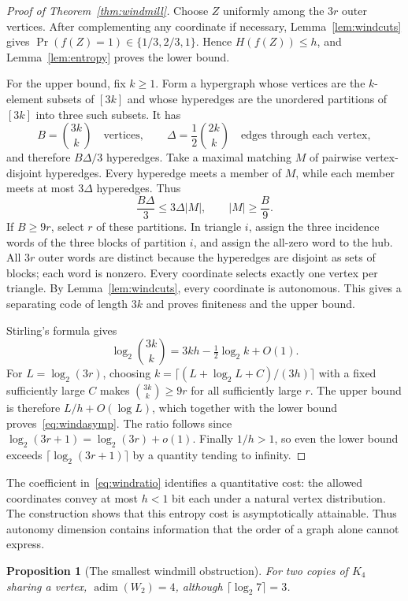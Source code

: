 \documentclass[11pt]{article}
\newtheorem{proposition}[theorem]{Proposition}
\theoremstyle{definition}
\newcommand{\adim}{\operatorname{adim}}
\numberwithin{equation}{section}
\begin{document}
\begin{proof}[Proof of Theorem~\ref{thm:windmill}]
Choose $Z$ uniformly among the $3r$ outer vertices. After complementing
any coordinate if necessary, Lemma~\ref{lem:windcuts} gives
$\Pr(f(Z)=1)\in\{1/3,2/3,1\}$. Hence $H(f(Z))\leq h$, and
Lemma~\ref{lem:entropy} proves the lower bound.

For the upper bound, fix $k\geq1$. Form a hypergraph whose vertices are
the $k$-element subsets of $[3k]$ and whose hyperedges are the unordered
partitions of $[3k]$ into three such subsets. It has
\[
 B=\binom{3k}{k}\quad\text{vertices},\qquad
 \Delta=\frac12\binom{2k}{k}\quad\text{edges through each vertex},
\]
and therefore $B\Delta/3$ hyperedges. Take a maximal matching $M$ of
pairwise vertex-disjoint hyperedges. Every hyperedge meets a member of
$M$, while each member meets at most $3\Delta$ hyperedges. Thus
\[
 \frac{B\Delta}{3}\leq3\Delta|M|,
 \qquad |M|\geq\frac B9.
\]
If $B\geq9r$, select $r$ of these partitions. In triangle $i$, assign the
three incidence words of the three blocks of partition $i$, and assign
the all-zero word to the hub. All $3r$ outer words are distinct because
the hyperedges are disjoint as sets of blocks; each word is nonzero.
Every coordinate selects exactly one vertex per triangle. By
Lemma~\ref{lem:windcuts}, every coordinate is autonomous. This gives a
separating code of length $3k$ and proves finiteness and the upper bound.

Stirling's formula gives
\[
 \log_2\binom{3k}{k}=3kh-\tfrac12\log_2 k+O(1).
\]
For $L=\log_2(3r)$, choosing
$k=\lceil(L+\log_2 L+C)/(3h)\rceil$ with a fixed sufficiently large $C$
makes $\binom{3k}{k}\geq9r$ for all sufficiently large $r$.
The upper bound is therefore $L/h+O(\log L)$, which together with the
lower bound proves~\eqref{eq:windasymp}. The ratio follows since
$\log_2(3r+1)=\log_2(3r)+o(1)$. Finally $1/h>1$, so even the lower bound
exceeds $\lceil\log_2(3r+1)\rceil$ by a quantity tending to infinity.
\end{proof}

The coefficient in~\eqref{eq:windratio} identifies a quantitative cost:
the allowed coordinates convey at most $h<1$ bit each under a natural
vertex distribution. The construction shows that this entropy cost is
asymptotically attainable. Thus autonomy dimension contains information
that the order of a graph alone cannot express.

\begin{proposition}[The smallest windmill obstruction]\label{prop:w2}
For two copies of $K_4$ sharing a vertex, $\adim(W_2)=4$, although
$\lceil\log_2 7\rceil=3$.
\end{proposition}
\end{document}
